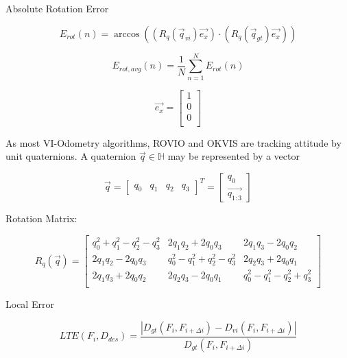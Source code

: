 Absolute Rotation Error

\begin{equation}
       E_{rot} \left( n \right) = \arccos \left(\left( R_q\left(\vec{q}_{vi}\right) \vec{e_{x}} \right) \cdot \left( R_q\left(\vec{q}_{gt}\right) \vec{e_{x}} \right)\right)
\end{equation}

\begin{equation}
       E_{rot, avg} \left( n \right) = \frac{1}{N} \sum_{n=1}^N E_{rot} \left( n \right)
\end{equation}

\begin{equation}
       \vec{e_{x}} = \left[ \begin{array}{c}
	1 \\
	0 \\
	0 \\ \end{array} \right]
\end{equation}

As most VI-Odometry algorithms, ROVIO and OKVIS are tracking attitude by unit quaternions. A quaternion $ \vec{q} \in \mathbb{H} $ may be represented by a vector

\begin{equation}
       \vec{q} = \left[ \begin{array}{cccc} q_0 & q_1 & q_2 & q_3 \end{array} \right]^T 
		   = \left[ \begin{array}{c} q_0 \\ \vec{q_{1 : 3}} \end{array} \right]
\end{equation}

Rotation Matrix:

\begin{equation}
       R_q \left( \vec{q}\right) = \left[ \begin{array}{ccc}
		q_0^2+q_1^2-q_2^2-q_3^2 	& 2 q_1 q_2+2 q_0 q_3			& 2 q_1 q_3-2 q_0 q_2 \\
		2 q_1 q_2-2 q_0 q_3		& q_0^2-q_1^2+q_2^2-q_3^2 	& 2 q_2 q_3+2 q_0 q_1 \\
		2 q_1 q_3+2 q_0 q_2		& 2 q_2 q_3-2 q_0 q_1			& q_0^2-q_1^2-q_2^2+q_3^2 \\
		\end{array} \right]
\end{equation}

Local Error

\begin{equation}
LTE \left( F_i, D_{des} \right) = \frac{\left|D_{gt} \left( F_i, F_{i+\Delta i} \right) - D_{vi} \left( F_i, F_{i+\Delta i} \right)\right|}{D_{gt} \left( F_i, F_{i+\Delta i} \right)}
\end{equation}

